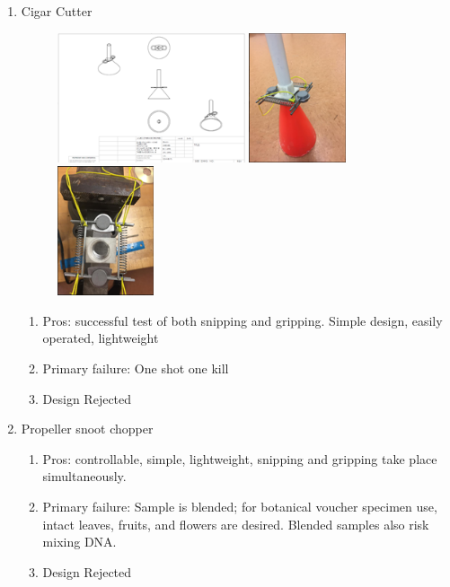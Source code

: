 \begin{enumerate}
\item Cigar Cutter
\begin{figure}
\begin{center}
\includegraphics[height=1.5in]{figures/robotarmmech4a.png}
\includegraphics[height=1.5in]{figures/robotarmmech4b.png}
\includegraphics[height=1.5in]{figures/robotarmmech4c.png}
\end{center}
\end{figure}
\begin{enumerate} 
\item Pros: successful test of both snipping and gripping. Simple design, easily operated, lightweight
\item Primary failure: One shot one kill
\item Design Rejected
\end{enumerate}

\item Propeller snoot chopper
\begin{enumerate}
\item Pros: controllable, simple, lightweight, snipping and gripping take place simultaneously.   
\item Primary failure: Sample is blended; for botanical voucher specimen use, intact leaves, fruits, and flowers are desired. Blended samples also risk mixing DNA. 
\item Design Rejected
\end{enumerate}


\end{enumerate}
